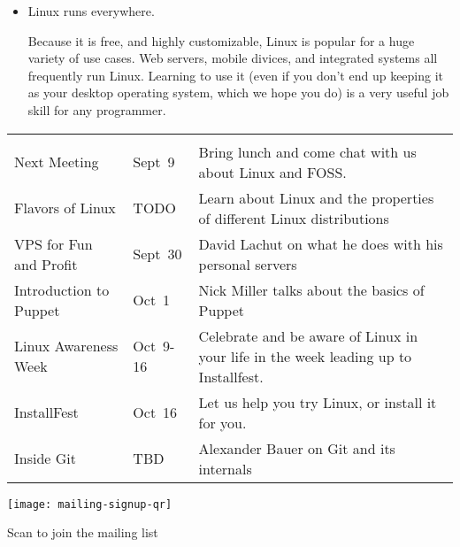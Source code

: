 \documentclass[11pt]{article}
\begin{document}
\begin{multicols*}{2}
\begin{itemize}
\item Linux runs everywhere.

  Because it is free, and highly customizable, Linux is popular for a huge variety of use
  cases. Web servers, mobile divices, and integrated systems all frequently run
  Linux. Learning to use it (even if you don't end up keeping it as your desktop operating
  system, which we hope you do) is a very useful job skill for any programmer.

\end{itemize}


\renewcommand{\arraystretch}{1.8}
\begin{tabular*}{\hsize}{>{\raggedright}p{0.23\hsize} >{\centering}p{0.1\hsize} p{0.55\hsize}}
    \multicolumn{3}{c}{\LARGE Fall 2015 Schedule of Events} \\
    \toprule \\

    Next Meeting & Sept~9 & Bring lunch and come chat with us about Linux
        and FOSS. \\

    Flavors of Linux & TODO & Learn about Linux and the properties of different
        Linux distributions \\

    VPS for Fun and Profit & Sept~30 & David Lachut on what he does with his
    personal servers \\

    Introduction to Puppet & Oct~1 & Nick Miller talks about the basics of Puppet \\

    Linux Awareness Week & \mbox{Oct~9-16} & Celebrate and be aware of
        Linux in your life in the week leading up to Installfest. \\

    InstallFest & Oct~16 & Let us help you try Linux, or install it
        for you. \\

    Inside Git & TBD & Alexander Bauer on Git and its internals \\

\end{tabular*}

    \begin{center}
        \texttt{[image: mailing-signup-qr]}
        \vspace{-3em}
        \parbox{\hsize}{\centering \parbox{0.3\hsize}{ \centering Scan to join the mailing list }}
    \end{center}


\end{multicols*}
\end{document}
